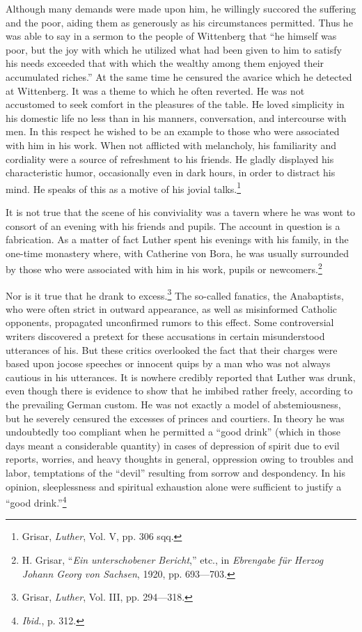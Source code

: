 Although many demands were made upon him, he willingly succored the suffering
and the poor, aiding them as generously as his
circumstances permitted. Thus he was able to say in a sermon to
the people of Wittenberg that “he himself was poor, but the joy
with which he utilized what had been given to him to satisfy his
needs exceeded that with which the wealthy among them enjoyed
their accumulated riches.” At the same time he censured the avarice
which he detected at Wittenberg. It was a theme to which he often
reverted. He was not accustomed to seek comfort in the pleasures
of the table. He loved simplicity in his domestic life no less than in
his manners, conversation, and intercourse with men. In this respect
he wished to be an example to those who were associated with him
in his work. When not afflicted with melancholy, his familiarity and
cordiality were a source of refreshment to his friends. He gladly displayed
his characteristic humor, occasionally even in dark hours, in
order to distract his mind. He speaks of this as a motive of his
jovial talks.\footnote{Grisar, \textit{Luther}, Vol. V, pp. 306 sqq.}

It is not true that the scene of his conviviality was a tavern where
he was wont to consort of an evening with his friends and pupils.
The account in question is a fabrication. As a matter of fact Luther
spent his evenings with his family, in the one-time monastery where,
with Catherine von Bora, he was usually surrounded by those who
were associated with him in his work, pupils or newcomers.\footnote
{H. Grisar, “\textit{Ein unterschobener Bericht},” etc., in \textit{Ebrengabe für Herzog Johann Georg
von Sachsen}, 1920, pp. 693—703.}

Nor is it true that he drank to excess.\footnote{Grisar, \textit{Luther}, Vol. III, pp. 294—318.}
 The so-called fanatics, the
Anabaptists, who were often strict in outward appearance, as well
as misinformed Catholic opponents, propagated unconfirmed rumors
to this effect. Some controversial writers discovered a pretext for
these accusations in certain misunderstood utterances of his. But
these critics overlooked the fact that their charges were based upon
jocose speeches or innocent quips by a man who was not always
cautious in his utterances. It is nowhere credibly reported that
Luther was drunk, even though there is evidence to show that he
imbibed rather freely, according to the prevailing German custom.
He was not exactly a model of abstemiousness, but he severely censured
the excesses of princes and courtiers. In theory he was undoubtedly
too compliant when he permitted a “good drink” (which
in those days meant a considerable quantity) in cases of depression
of spirit due to evil reports, worries, and heavy thoughts in general,
oppression owing to troubles and labor, temptations of the “devil”
resulting from sorrow and despondency. In his opinion, sleeplessness
and spiritual exhaustion alone were sufficient to justify a ``good
drink.''\footnote{\textit{Ibid.}, p. 312.}



